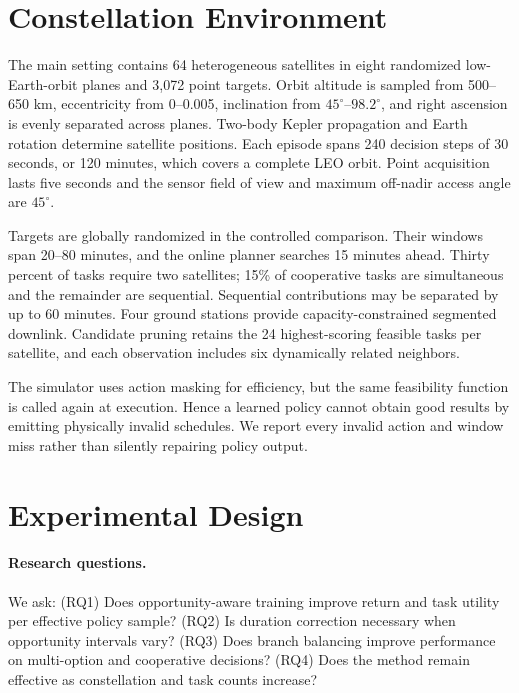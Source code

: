 \documentclass[letterpaper]{article}
\begin{document}
\section{Constellation Environment}

The main setting contains 64 heterogeneous satellites in eight randomized low-Earth-orbit planes and 3,072 point targets.  Orbit altitude is sampled from 500--650 km, eccentricity from 0--0.005, inclination from $45^\circ$--$98.2^\circ$, and right ascension is evenly separated across planes.  Two-body Kepler propagation and Earth rotation determine satellite positions.  Each episode spans 240 decision steps of 30 seconds, or 120 minutes, which covers a complete LEO orbit.  Point acquisition lasts five seconds and the sensor field of view and maximum off-nadir access angle are $45^\circ$.

Targets are globally randomized in the controlled comparison.  Their windows span 20--80 minutes, and the online planner searches 15 minutes ahead.  Thirty percent of tasks require two satellites; 15\% of cooperative tasks are simultaneous and the remainder are sequential.  Sequential contributions may be separated by up to 60 minutes.  Four ground stations provide capacity-constrained segmented downlink.  Candidate pruning retains the 24 highest-scoring feasible tasks per satellite, and each observation includes six dynamically related neighbors.

The simulator uses action masking for efficiency, but the same feasibility function is called again at execution.  Hence a learned policy cannot obtain good results by emitting physically invalid schedules.  We report every invalid action and window miss rather than silently repairing policy output.

\section{Experimental Design}

\paragraph{Research questions.}
We ask: (RQ1) Does opportunity-aware training improve return and task utility per effective policy sample?  (RQ2) Is duration correction necessary when opportunity intervals vary?  (RQ3) Does branch balancing improve performance on multi-option and cooperative decisions?  (RQ4) Does the method remain effective as constellation and task counts increase?
\end{document}
